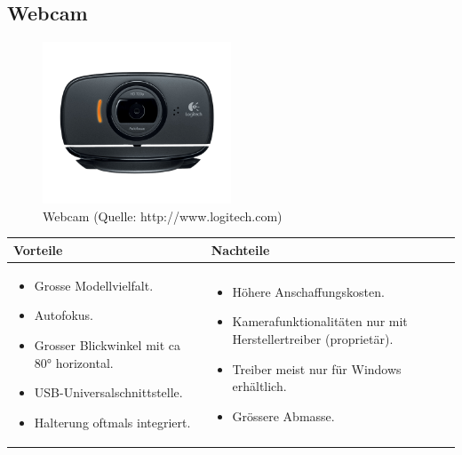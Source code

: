 \pagebreak

\subsection{Webcam}

\begin{figure}[h!]%
\centering
\includegraphics[width=0.5\textwidth]{fig/hd-webcam-c525-gallery.png}
\caption{Webcam (Quelle: http://www.logitech.com)}
\label{fig:Webcam}
\end{figure}

\begin{table}[h]
\begin{tabular}{p{} | p{}}


 \textbf{Vorteile} & \textbf{Nachteile} \\ \hline
	 
\begin{itemize}
\item Grosse Modellvielfalt.
\item Autofokus.
\item Grosser Blickwinkel mit ca 80° horizontal.
\item USB-Universalschnittstelle.
\item Halterung oftmals integriert.
\end{itemize}

 
 &
 
\begin{itemize}
\item Höhere Anschaffungskosten.
\item Kamerafunktionalitäten nur mit Herstellertreiber (proprietär).
\item Treiber meist nur für Windows erhältlich.
\item Grössere Abmasse.
\end{itemize}

\end{tabular}
\end{table}


